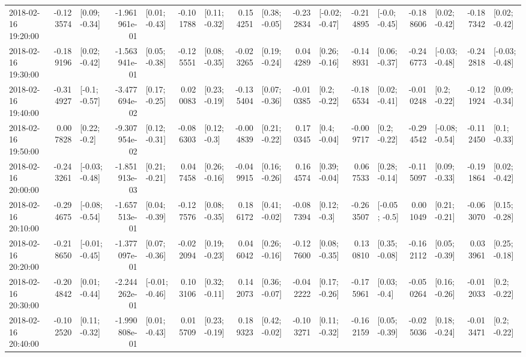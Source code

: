 \begin{tabular}{lrlrlrlrlrlrlrlrl}
2018-02-16 19:20:00 & -0.123574 &   [0.09; -0.34] & -1.961961e-01 &   [0.01; -0.43] & -0.101788 &   [0.11; -0.32] &  0.154251 &   [0.38; -0.05] & -0.232834 &  [-0.02; -0.47] & -0.214895 &   [-0.0; -0.45] & -0.188606 &   [0.02; -0.42] & -0.187342 &   [0.02; -0.42] \\
2018-02-16 19:30:00 & -0.189196 &   [0.02; -0.42] & -1.563941e-01 &   [0.05; -0.38] & -0.125551 &   [0.08; -0.35] & -0.023265 &   [0.19; -0.24] &  0.044289 &   [0.26; -0.16] & -0.148931 &   [0.06; -0.37] & -0.246773 &  [-0.03; -0.48] & -0.242818 &  [-0.03; -0.48] \\
2018-02-16 19:40:00 & -0.314927 &   [-0.1; -0.57] & -3.477694e-02 &   [0.17; -0.25] &  0.020083 &   [0.23; -0.19] & -0.135404 &   [0.07; -0.36] & -0.010385 &    [0.2; -0.22] & -0.186534 &   [0.02; -0.41] & -0.010248 &    [0.2; -0.22] & -0.121924 &   [0.09; -0.34] \\
2018-02-16 19:50:00 &  0.007828 &    [0.22; -0.2] & -9.307954e-02 &   [0.12; -0.31] & -0.086303 &    [0.12; -0.3] & -0.004839 &   [0.21; -0.22] &  0.170345 &    [0.4; -0.04] & -0.009717 &    [0.2; -0.22] & -0.294542 &  [-0.08; -0.54] & -0.112450 &    [0.1; -0.33] \\
2018-02-16 20:00:00 & -0.243261 &  [-0.03; -0.48] & -1.851913e-03 &   [0.21; -0.21] &  0.047458 &   [0.26; -0.16] & -0.049915 &   [0.16; -0.26] &  0.164574 &   [0.39; -0.04] &  0.067533 &   [0.28; -0.14] & -0.115097 &   [0.09; -0.33] & -0.191864 &   [0.02; -0.42] \\
2018-02-16 20:10:00 & -0.294675 &  [-0.08; -0.54] & -1.657513e-01 &   [0.04; -0.39] & -0.127576 &   [0.08; -0.35] &  0.186172 &   [0.41; -0.02] & -0.087394 &    [0.12; -0.3] & -0.263507 &   [-0.05; -0.5] &  0.001049 &   [0.21; -0.21] & -0.063070 &   [0.15; -0.28] \\
2018-02-16 20:20:00 & -0.218650 &  [-0.01; -0.45] & -1.377097e-01 &   [0.07; -0.36] & -0.022094 &   [0.19; -0.23] &  0.046042 &   [0.26; -0.16] & -0.127600 &   [0.08; -0.35] &  0.130810 &   [0.35; -0.08] & -0.162112 &   [0.05; -0.39] &  0.033961 &   [0.25; -0.18] \\
2018-02-16 20:30:00 & -0.204842 &   [0.01; -0.44] & -2.244262e-01 &  [-0.01; -0.46] &  0.103106 &   [0.32; -0.11] &  0.142073 &   [0.36; -0.07] & -0.042222 &   [0.17; -0.26] & -0.175961 &    [0.03; -0.4] & -0.050264 &   [0.16; -0.26] & -0.012033 &    [0.2; -0.22] \\
2018-02-16 20:40:00 & -0.102520 &   [0.11; -0.32] & -1.990808e-01 &   [0.01; -0.43] &  0.015709 &   [0.23; -0.19] &  0.189323 &   [0.42; -0.02] & -0.103271 &   [0.11; -0.32] & -0.162159 &   [0.05; -0.39] & -0.025036 &   [0.18; -0.24] & -0.013471 &    [0.2; -0.22] \\

\end{tabular}
